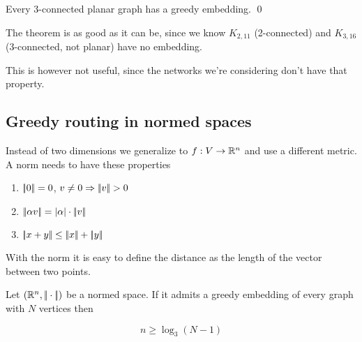 \begin{thm} Every 3-connected planar graph has a greedy embedding. \qed\end{thm}

The theorem is as good as it can be, since we know $K_{2,11}$ (2-connected) and $K_{3,16}$ (3-connected, not planar) have no embedding.

This is however not useful, since the networks we're considering don't have that property.

\subsection{Greedy routing in normed spaces}

Instead of two dimensions we generalize to $f:V\rightarrow \mathbb{R}^n$ and use a different metric. A norm needs to have these properties

\begin{enumerate}
\item $|\!|0|\!| = 0$, $v\neq 0 \Rightarrow |\!|v|\!| >0$
\item $|\!|\alpha v|\!|= |\alpha | \cdot |\!|v|\!|$
\item $|\!|x+y|\!| \leq |\!|x|\!| +|\!|y|\!|$
\end{enumerate}

With the norm it is easy to define the distance as the length of the vector between two points.

\begin{lem} Let $(\mathbb{R}^n, |\!|\cdot|\!|)$ be a normed space. If it admits a greedy embedding of every graph with $N$ vertices then

\[n \geq \log_3(N-1)\]
\end{lem}

